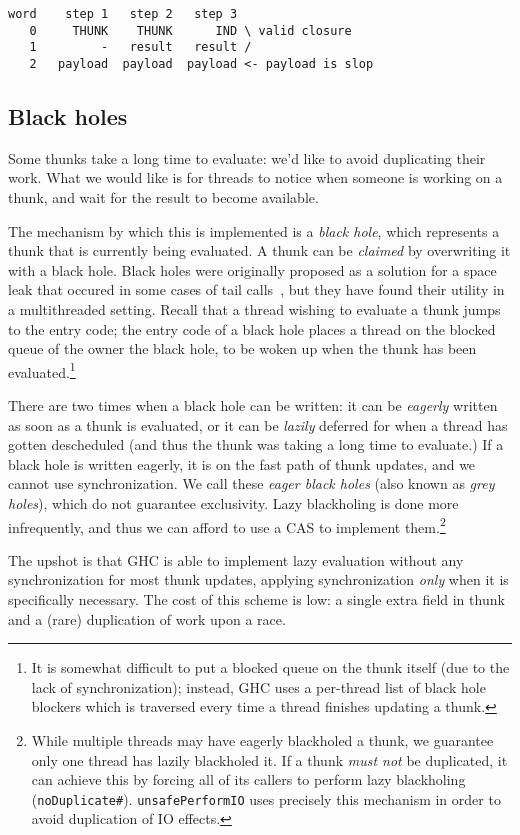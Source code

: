\begin{verbatim}
word    step 1   step 2   step 3
   0     THUNK    THUNK      IND \ valid closure
   1         -   result   result /
   2   payload  payload  payload <- payload is slop
\end{verbatim}

\subsection{Black holes} \label{sec:blackhole}

Some thunks take a long time to evaluate: we'd like to avoid duplicating
their work.  What we would like is for threads to notice when someone is
working on a thunk, and wait for the result to become available.

The mechanism by which this is implemented is a \emph{black hole}, which
represents a thunk that is currently being evaluated.  A thunk can be
\emph{claimed} by overwriting it with a black hole.  Black holes were
originally proposed as a solution for a space leak that occured in some
cases of tail calls~\cite{Jones2008}, but they have found their utility
in a multithreaded setting.  Recall that a thread wishing to evaluate
a thunk jumps to the entry code; the entry code of a black hole
places a thread on the blocked queue of the owner the black hole, to
be woken up when the thunk has been evaluated.\footnote{It is somewhat difficult
to put a blocked queue on the thunk itself (due to the lack of
synchronization); instead, GHC uses a per-thread list of black hole
blockers which is traversed every time a thread finishes updating a
thunk.}

There are two times when a black hole can be written: it can be \emph{eagerly}
written as soon as a thunk is evaluated, or it can be \emph{lazily} deferred
for when a thread has gotten descheduled (and thus the thunk was taking
a long time to evaluate.)  If a black hole is written eagerly,
it is on the fast path of thunk updates, and we cannot use
synchronization.  We call these \emph{eager black holes} (also known as
\emph{grey holes}), which do not guarantee exclusivity.  Lazy blackholing is done more infrequently, and thus
we can afford to use a CAS to implement them.\footnote{While multiple
    threads may have eagerly blackholed a thunk, we guarantee only one
    thread has lazily blackholed it.  If a thunk \emph{must not} be
duplicated, it can achieve this by forcing all of its callers to perform
lazy blackholing
(\texttt{noDuplicate\#}).  \texttt{unsafePerformIO} uses precisely
this mechanism in order to avoid duplication of IO effects.}

The upshot is that GHC is able to implement lazy evaluation without any
synchronization for most thunk updates, applying synchronization
\emph{only} when it is specifically necessary. The cost of this scheme
is low: a single extra field in thunk and a (rare) duplication of work
upon a race.
